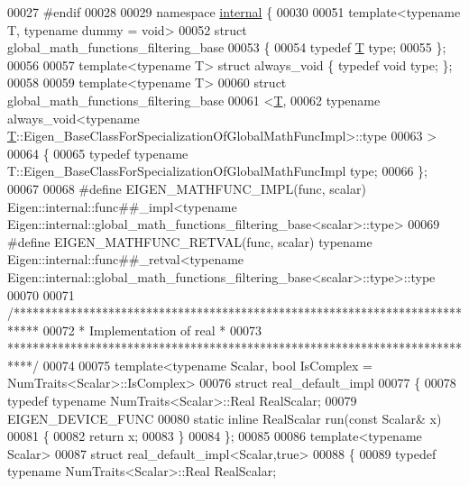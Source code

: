 \begin{DoxyCode}
00027 \textcolor{preprocessor}{#endif}
00028 
00029 \textcolor{keyword}{namespace }\hyperlink{namespaceinternal}{internal} \{
00030 
00051 \textcolor{keyword}{template}<\textcolor{keyword}{typename} T, \textcolor{keyword}{typename} dummy = \textcolor{keywordtype}{void}>
00052 \textcolor{keyword}{struct }global\_math\_functions\_filtering\_base
00053 \{
00054   \textcolor{keyword}{typedef} \hyperlink{group___sparse_core___module_class_eigen_1_1_triplet}{T} type;
00055 \};
00056 
00057 \textcolor{keyword}{template}<\textcolor{keyword}{typename} T> \textcolor{keyword}{struct }always\_void \{ \textcolor{keyword}{typedef} \textcolor{keywordtype}{void} type; \};
00058 
00059 \textcolor{keyword}{template}<\textcolor{keyword}{typename} T>
00060 \textcolor{keyword}{struct }global\_math\_functions\_filtering\_base
00061   <\hyperlink{group___sparse_core___module_class_eigen_1_1_triplet}{T},
00062    typename always\_void<typename \hyperlink{group___sparse_core___module_class_eigen_1_1_triplet}{T}::Eigen\_BaseClassForSpecializationOfGlobalMathFuncImpl>::type
00063   >
00064 \{
00065   \textcolor{keyword}{typedef} \textcolor{keyword}{typename} T::Eigen\_BaseClassForSpecializationOfGlobalMathFuncImpl type;
00066 \};
00067 
00068 \textcolor{preprocessor}{#define EIGEN\_MATHFUNC\_IMPL(func, scalar) Eigen::internal::func##\_impl<typename
       Eigen::internal::global\_math\_functions\_filtering\_base<scalar>::type>}
00069 \textcolor{preprocessor}{#define EIGEN\_MATHFUNC\_RETVAL(func, scalar) typename Eigen::internal::func##\_retval<typename
       Eigen::internal::global\_math\_functions\_filtering\_base<scalar>::type>::type}
00070 
00071 \textcolor{comment}{/****************************************************************************}
00072 \textcolor{comment}{* Implementation of real                                                 *}
00073 \textcolor{comment}{****************************************************************************/}
00074 
00075 template<typename Scalar, bool IsComplex = NumTraits<Scalar>::IsComplex>
00076 \textcolor{keyword}{struct }real\_default\_impl
00077 \{
00078   \textcolor{keyword}{typedef} \textcolor{keyword}{typename} NumTraits<Scalar>::Real RealScalar;
00079   EIGEN\_DEVICE\_FUNC
00080   \textcolor{keyword}{static} \textcolor{keyword}{inline} RealScalar run(\textcolor{keyword}{const} Scalar& x)
00081   \{
00082     \textcolor{keywordflow}{return} x;
00083   \}
00084 \};
00085 
00086 \textcolor{keyword}{template}<\textcolor{keyword}{typename} Scalar>
00087 \textcolor{keyword}{struct }real\_default\_impl<Scalar,true>
00088 \{
00089   \textcolor{keyword}{typedef} \textcolor{keyword}{typename} NumTraits<Scalar>::Real RealScalar;

\end{DoxyCode}
